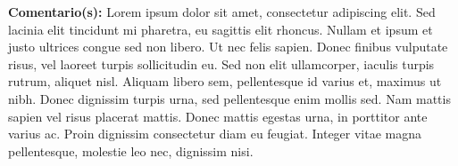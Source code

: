 \noindent\textbf{Comentario(s):} 
Lorem ipsum dolor sit amet, consectetur adipiscing elit. Sed lacinia elit tincidunt mi pharetra, eu sagittis elit rhoncus. Nullam et ipsum et justo ultrices congue sed non libero. Ut nec felis sapien. Donec finibus vulputate risus, vel laoreet turpis sollicitudin eu. Sed non elit ullamcorper, iaculis turpis rutrum, aliquet nisl. Aliquam libero sem, pellentesque id varius et, maximus ut nibh. Donec dignissim turpis urna, sed pellentesque enim mollis sed. Nam mattis sapien vel risus placerat mattis. Donec mattis egestas urna, in porttitor ante varius ac. Proin dignissim consectetur diam eu feugiat. Integer vitae magna pellentesque, molestie leo nec, dignissim nisi. 